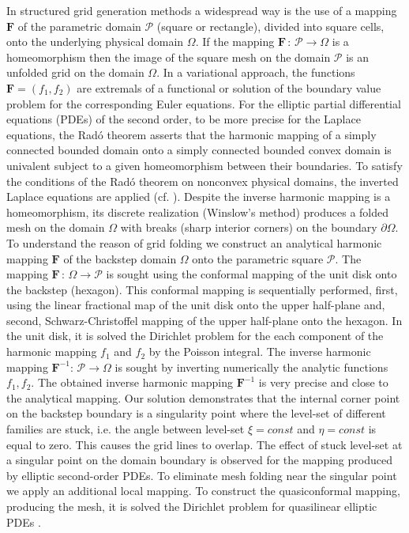 In structured grid generation methods a widespread way is the use of a mapping $\mathbf F$ of the parametric domain $\mathcal P$ (square or rectangle), divided into square cells, onto the underlying physical domain $\Omega$. If the mapping $\mathbf F\,{:}\,\mathcal P{\rightarrow}\Omega$ is a homeomorphism then the image of the square mesh on the domain $\mathcal P$ is an unfolded grid on the domain $\Omega$. In a variational approach, the functions $\mathbf F{=}(f_1,f_2)$ are extremals of a functional or solution of the boundary value problem for the corresponding Euler equations. For the elliptic partial differential equations (PDEs) of the second order, to be more precise for the Laplace equations, the Rad\'o theorem \cite{Rado26} asserts that the harmonic mapping of a simply connected bounded domain onto a simply connected bounded convex domain is univalent subject to a given homeomorphism between their boundaries. To satisfy the conditions of the Rad\'o theorem on nonconvex physical domains, the inverted Laplace equations are applied (cf. \cite{Winslow67,Thomp74}). Despite the inverse harmonic mapping is a homeomorphism, its discrete realization (Winslow's method) produces a folded mesh on the domain $\Omega$ with breaks (sharp interior corners) on the boundary $\partial\Omega$. To understand the reason of grid folding we construct an analytical harmonic mapping $\mathbf F$ of the backstep domain $\Omega$ onto the parametric square $\mathcal P$. The mapping $\mathbf F\,{:}\,\Omega{\rightarrow}\mathcal P$ is sought using the conformal mapping of the unit disk onto the backstep (hexagon). This conformal mapping is sequentially performed, first, using the linear fractional map of the unit disk onto the upper half-plane and, second, Schwarz-Christoffel mapping of the upper half-plane onto the hexagon. In the unit disk, it is solved the Dirichlet problem for the each component of the harmonic mapping $f_1$ and $f_2$ by the Poisson integral. The inverse harmonic mapping $\mathbf F^{-1}{:}\,\mathcal P{\rightarrow}\Omega$ is sought by inverting numerically the analytic functions $f_1,f_2$. The obtained inverse harmonic mapping $\mathbf F^{-1}$ is very precise and close to the analytical mapping. Our solution demonstrates that the internal corner point on the backstep boundary is a singularity point where the level-set of different families are stuck, i.e. the angle between level-set $\xi{=}const$ and  $\eta{=}const$ is equal to zero. This causes the grid lines to overlap. The effect of stuck level-set at a singular point on the domain boundary is observed for the mapping produced by elliptic second-order PDEs. To eliminate mesh folding near the singular point we apply an additional local mapping. To construct the quasiconformal mapping, producing the mesh, it is solved the Dirichlet problem for quasilinear elliptic PDEs \cite{Azar09,Azar10}.


